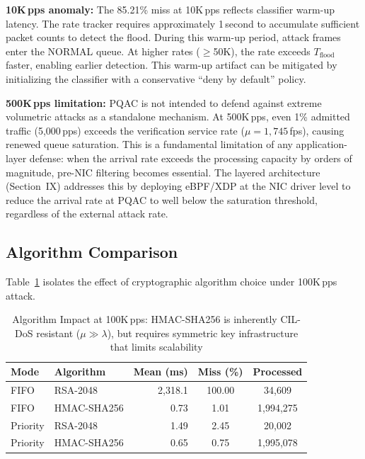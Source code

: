 \documentclass{ieeeaccess}
\begin{document}
\textbf{10K\,pps anomaly:} The 85.21\% miss at 10K\,pps reflects classifier warm-up latency. The rate tracker requires approximately 1\,second to accumulate sufficient packet counts to detect the flood. During this warm-up period, attack frames enter the NORMAL queue. At higher rates ($\geq$50K), the rate exceeds $T_{\text{flood}}$ faster, enabling earlier detection. This warm-up artifact can be mitigated by initializing the classifier with a conservative ``deny by default'' policy.

\textbf{500K\,pps limitation:} PQAC is not intended to defend against extreme volumetric attacks as a standalone mechanism. At 500K\,pps, even 1\% admitted traffic (5,000\,pps) exceeds the verification service rate ($\mu = 1{,}745$\,fps), causing renewed queue saturation. This is a fundamental limitation of any application-layer defense: when the arrival rate exceeds the processing capacity by orders of magnitude, pre-NIC filtering becomes essential. The layered architecture (Section~IX) addresses this by deploying eBPF/XDP at the NIC driver level to reduce the arrival rate at PQAC to well below the saturation threshold, regardless of the external attack rate.

\subsection{Algorithm Comparison}
Table~\ref{tab:algo_comparison} isolates the effect of cryptographic algorithm choice under 100K\,pps attack.

\begin{table}[t]
\caption{Algorithm Impact at 100K\,pps: HMAC-SHA256 is inherently CIL-DoS resistant ($\mu \gg \lambda$), but requires symmetric key infrastructure that limits scalability}
\label{tab:algo_comparison}
\centering
\small
\begin{tabular}{llrcc}
\toprule
\textbf{Mode} & \textbf{Algorithm} & \textbf{Mean (ms)} & \textbf{Miss (\%)} & \textbf{Processed} \\
\midrule
FIFO     & RSA-2048    & 2,318.1 & 100.00 & 34,609 \\
FIFO     & HMAC-SHA256 & 0.73    & 1.01   & 1,994,275 \\
Priority & RSA-2048    & 1.49    & 2.45   & 20,002 \\
Priority & HMAC-SHA256 & 0.65    & 0.75   & 1,995,078 \\
\bottomrule
\end{tabular}
\end{table}
\end{document}
